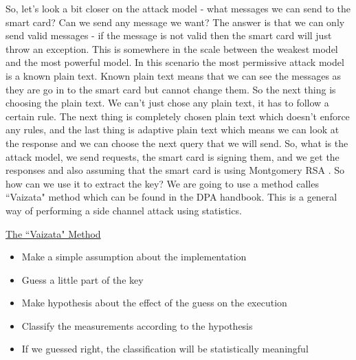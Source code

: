 So, let's look a bit closer on the attack model - what messages we can send to
the smart card? Can we send any message we want? The answer is that we can only send
valid messages - if the message is not valid then the smart card will just throw 
an exception.
This is somewhere in the scale between the weakest model and the most
powerful model. In this scenario the most permissive attack model is a known plain
text. Known plain text means that we can see the messages as they are go in to the
smart card but cannot change them. So the next thing is choosing the plain text. 
We can't just chose any plain text, it has to follow a certain rule. The next
thing is completely chosen plain text which doesn't enforce any rules, and the
last thing is adaptive plain text which means we can look at the response and we
can choose the next query that we will send. So, what is the attack model, we send
requests, the smart card is signing them, and we get the responses and also
assuming that the smart card is using Montgomery RSA . So how can we use it to
extract the key? We are going to use a method
calles ``Vaizata" method which can be found in the DPA handbook. This is a
general way of performing a side channel attack using statistics. \newline

\underline{The ``Vaizata" Method}
\begin{itemize}
	\item Make a simple assumption about the implementation
	\item Guess a little part of the key
	\item Make hypothesis about the effect of the guess on the execution
	\item Classify the measurements according to the hypothesis
	\item If we guessed right, the classification will be statistically
	meaningful
\end{itemize}

